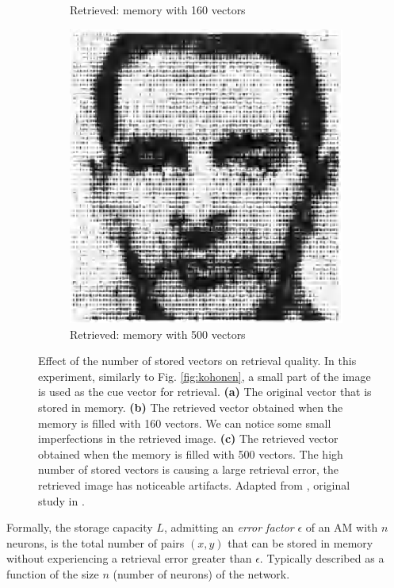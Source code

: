 \documentclass[runningheads]{llncs}
\begin{document}
\begin{figure}[htbp]
\begin{subfigure}[t]{0.3\textwidth}
         \caption{Retrieved: memory with 160 vectors}
         \label{kohonen2B}
     \end{subfigure}
     \hfill
     \begin{subfigure}[t]{0.3\textwidth}
         \centering
         \includegraphics[width=\textwidth]{img/kohonenD.png}
         \caption{Retrieved: memory with 500 vectors}
         \label{kohonen2C}
     \end{subfigure}
        \caption{Effect of the number of stored vectors on retrieval quality. In this experiment, similarly to Fig. \ref{fig:kohonen}, a small part of the image is used as the cue vector for retrieval. \textbf{(a)} The original vector that is stored in memory. \textbf{(b)} The retrieved vector obtained when the memory is filled with 160 vectors. We can notice some small imperfections in the retrieved image. \textbf{(c)} The retrieved vector obtained when the memory is filled with 500 vectors. The high number of stored vectors is causing a large retrieval error, the retrieved image has noticeable artifacts. Adapted from \cite{kohonen2012self}, original study in \cite{kohonen1977principle}.}
        \label{fig:kohonen2}
\end{figure}
    
Formally, the storage capacity $L$, admitting an \textit{error factor} $\epsilon$ of an AM with $n$ neurons, is the total number of pairs $(x,y)$ that can be stored in memory without experiencing a retrieval error greater than $\epsilon$. Typically described as a function of the size $n$ (number of neurons) of the network.
\end{document}
